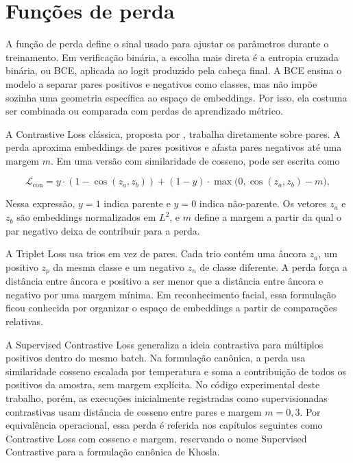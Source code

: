 \section{Funções de perda}

A função de perda define o sinal usado para ajustar os parâmetros durante o treinamento. Em verificação binária, a escolha mais direta é a entropia cruzada binária, ou BCE, aplicada ao logit produzido pela cabeça final. A BCE ensina o modelo a separar pares positivos e negativos como classes, mas não impõe sozinha uma geometria específica ao espaço de embeddings. Por isso, ela costuma ser combinada ou comparada com perdas de aprendizado métrico.

A Contrastive Loss clássica, proposta por , trabalha diretamente sobre pares. A perda aproxima embeddings de pares positivos e afasta pares negativos até uma margem $m$. Em uma versão com similaridade de cosseno, pode ser escrita como

\begin{equation}
\mathcal{L}_{\text{con}} = y \cdot (1 - \cos(z_a, z_b)) + (1 - y) \cdot \max\!\big(0, \cos(z_a, z_b) - m\big),
\label{eq:contrastive}
\end{equation}

Nessa expressão, $y=1$ indica parente e $y=0$ indica não-parente. Os vetores $z_a$ e $z_b$ são embeddings normalizados em $L^2$, e $m$ define a margem a partir da qual o par negativo deixa de contribuir para a perda.

A Triplet Loss  usa trios em vez de pares. Cada trio contém uma âncora $z_a$, um positivo $z_p$ da mesma classe e um negativo $z_n$ de classe diferente. A perda força a distância entre âncora e positivo a ser menor que a distância entre âncora e negativo por uma margem mínima. Em reconhecimento facial, essa formulação ficou conhecida por organizar o espaço de embeddings a partir de comparações relativas.

A Supervised Contrastive Loss \cite{khosla2020supervised} generaliza a ideia contrastiva para múltiplos positivos dentro do mesmo batch. Na formulação canônica, a perda usa similaridade cosseno escalada por temperatura e soma a contribuição de todos os positivos da amostra, sem margem explícita. No código experimental deste trabalho, porém, as execuções inicialmente registradas como supervisionadas contrastivas usam distância de cosseno entre pares e margem $m = 0{,}3$. Por equivalência operacional, essa perda é referida nos capítulos seguintes como Contrastive Loss com cosseno e margem, reservando o nome Supervised Contrastive para a formulação canônica de Khosla.

